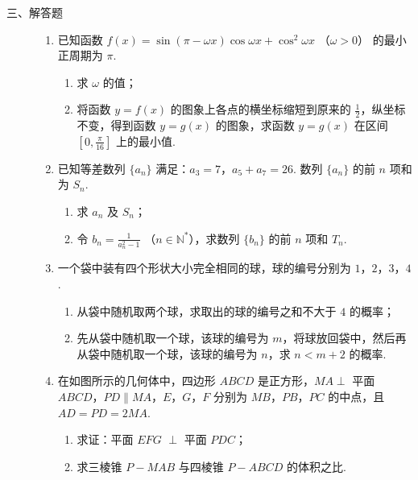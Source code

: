 \begin{description}

    \item[三、解答题]

    \begin{enumerate}[leftmargin=5pt]

      \addtocounter{enumi}{+16}

        \item 已知函数 \(f(x) = \sin(\pi - \omega x)\cos \omega x + \cos^2\omega x\) （\(\omega > 0\)） 的最小正周期为 \(\pi\).

\begin{enumerate}
\item 求 \(\omega\) 的值；
\item 将函数 \(y = f(x)\) 的图象上各点的横坐标缩短到原来的 \(\frac{1}{2}\)，纵坐标不变，得到函数 \(y = g(x)\) 的图象，求函数 \(y = g(x)\) 在区间 \(\left[0, \frac{\pi}{16}\right]\) 上的最小值.
\end{enumerate}

        \item 已知等差数列 \(\{a_n\}\) 满足：\(a_3 = 7\)，\(a_5 + a_7 = 26\). 数列 \(\{a_n\}\) 的前 \(n\) 项和为 \(S_n\).

\begin{enumerate}
\item 求 \(a_n\) 及 \(S_n\)；
\item 令 \(b_n = \frac{1}{a_n^2 - 1}\) （\(n \in \mathbb{N}^*\)），求数列 \(\{b_n\}\) 的前 \(n\) 项和 \(T_n\).
\end{enumerate}

        \item 一个袋中装有四个形状大小完全相同的球，球的编号分别为 \(1\)，\(2\)，\(3\)，\(4\).

\begin{enumerate}
\item 从袋中随机取两个球，求取出的球的编号之和不大于 \(4\) 的概率；
\item 先从袋中随机取一个球，该球的编号为 \(m\)，将球放回袋中，然后再从袋中随机取一个球，该球的编号为 \(n\)，求 \(n < m + 2\) 的概率.
\end{enumerate}

        \item 在如图所示的几何体中，四边形 \(ABCD\) 是正方形，\(MA \perp\) 平面 \(ABCD\)，\(PD \parallel MA\)，\(E\)，\(G\)，\(F\) 分别为 \(MB\)，\(PB\)，\(PC\) 的中点，且 \(AD = PD = 2MA\).

\begin{enumerate}
\item 求证：平面 \(EFG\) \(\perp\) 平面 \(PDC\)；
\item 求三棱锥 \(P - MAB\) 与四棱锥 \(P - ABCD\) 的体积之比.
\end{enumerate}


\end{enumerate}
\end{description}
